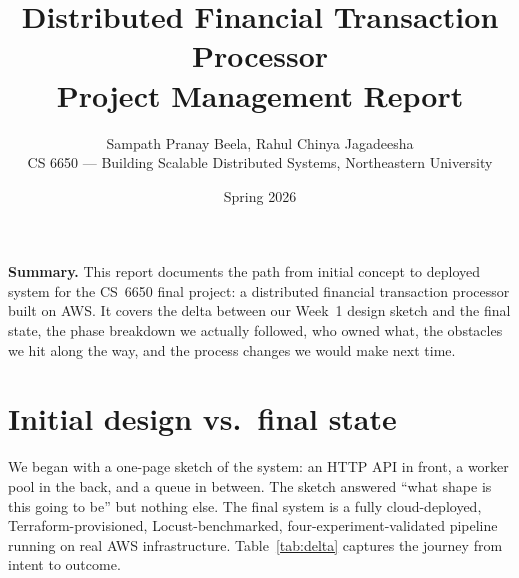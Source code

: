 \documentclass[11pt,a4paper]{article}
\title{\vspace{-1.5em}\textbf{\color{accentblue}Distributed Financial Transaction Processor} \\ \large Project Management Report\vspace{-0.3em}}
\author{Sampath Pranay Beela, Rahul Chinya Jagadeesha \\ \small CS 6650 --- Building Scalable Distributed Systems, Northeastern University}
\date{\vspace{-0.5em}\small Spring 2026}
\begin{document}
\maketitle
\thispagestyle{fancy}
\vspace{-1.8em}

\begin{infobox}
\textbf{Summary.} This report documents the path from initial concept to deployed system for the CS~6650 final project: a distributed financial transaction processor built on AWS. It covers the delta between our Week~1 design sketch and the final state, the phase breakdown we actually followed, who owned what, the obstacles we hit along the way, and the process changes we would make next time.
\end{infobox}

\section{Initial design vs.\ final state}

We began with a one-page sketch of the system: an HTTP API in front, a worker pool in the back, and a queue in between. The sketch answered ``what shape is this going to be'' but nothing else. The final system is a fully cloud-deployed, Terraform-provisioned, Locust-benchmarked, four-experiment-validated pipeline running on real AWS infrastructure. Table~\ref{tab:delta} captures the journey from intent to outcome.
\end{document}
